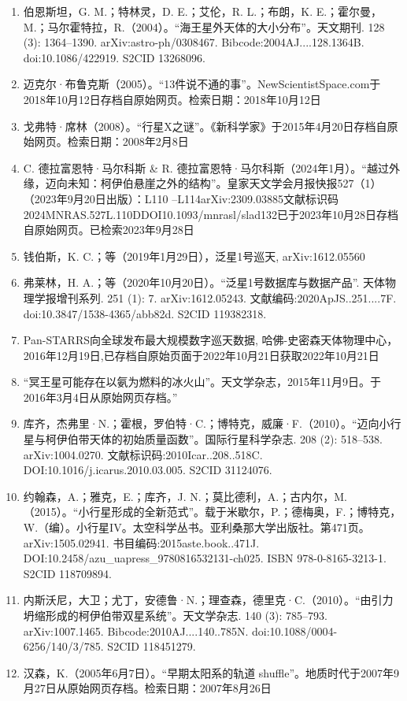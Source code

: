 \begin{enumerate}
\item 伯恩斯坦，G. M.；特林灵，D. E.；艾伦，R. L.；布朗，K. E.；霍尔曼，M.；马尔霍特拉，R.（2004）。“海王星外天体的大小分布”。天文期刊. 128 (3): 1364–1390. arXiv:astro-ph/0308467. Bibcode:2004AJ....128.1364B. doi:10.1086/422919. S2CID 13268096.
\item 迈克尔·布鲁克斯（2005）。“13件说不通的事”。NewScientistSpace.com于2018年10月12日存档自原始网页。检索日期：2018年10月12日
\item 戈弗特·席林（2008）。“行星X之谜”。《新科学家》于2015年4月20日存档自原始网页。检索日期：2008年2月8日
\item C. 德拉富恩特·马尔科斯 & R. 德拉富恩特·马尔科斯（2024年1月）。“越过外缘，迈向未知：柯伊伯悬崖之外的结构”。皇家天文学会月报快报527（1）（2023年9月20日出版）：L110 –L114arXiv:2309.03885文献标识码2024MNRAS.527L.110DDOI10.1093/mnrasl/slad132已于2023年10月28日存档自原始网页。已检索2023年9月28日
\item 钱伯斯，K. C.；等（2019年1月29日），泛星1号巡天, arXiv:1612.05560
\item 弗莱林，H. A.；等（2020年10月20日）。“泛星1号数据库与数据产品”. 天体物理学报增刊系列. 251 (1): 7. arXiv:1612.05243. 文献编码:2020ApJS..251....7F. doi:10.3847/1538-4365/abb82d. S2CID 119382318.
\item Pan-STARRS向全球发布最大规模数字巡天数据, 哈佛-史密森天体物理中心，2016年12月19日,已存档自原始页面于2022年10月21日获取2022年10月21日
\item “冥王星可能存在以氨为燃料的冰火山”。天文学杂志，2015年11月9日。于2016年3月4日从原始网页存档。”
\item 库齐，杰弗里·N.；霍根，罗伯特·C.；博特克，威廉·F.（2010）。“迈向小行星与柯伊伯带天体的初始质量函数”。国际行星科学杂志. 208 (2): 518–538. arXiv:1004.0270. 文献标识码:2010Icar..208..518C. DOI:10.1016/j.icarus.2010.03.005. S2CID 31124076.
\item 约翰森，A.；雅克，E.；库齐，J. N.；莫比德利，A.；古内尔，M.（2015）。“小行星形成的全新范式”。载于米歇尔，P.；德梅奥，F.；博特克，W.（编）。小行星IV。太空科学丛书。亚利桑那大学出版社。第471页。arXiv:1505.02941. 书目编码:2015aste.book..471J. DOI:10.2458/azu_uapress_9780816532131-ch025. ISBN 978-0-8165-3213-1. S2CID 118709894.
\item 内斯沃尼，大卫；尤丁，安德鲁·N.；理查森，德里克·C.（2010）。“由引力坍缩形成的柯伊伯带双星系统”。天文学杂志. 140 (3): 785–793. arXiv:1007.1465. Bibcode:2010AJ....140..785N. doi:10.1088/0004-6256/140/3/785. S2CID 118451279.
\item 汉森，K.（2005年6月7日）。“早期太阳系的轨道 shuffle”。地质时代于2007年9月27日从原始网页存档。检索日期：2007年8月26日

\end{enumerate}
